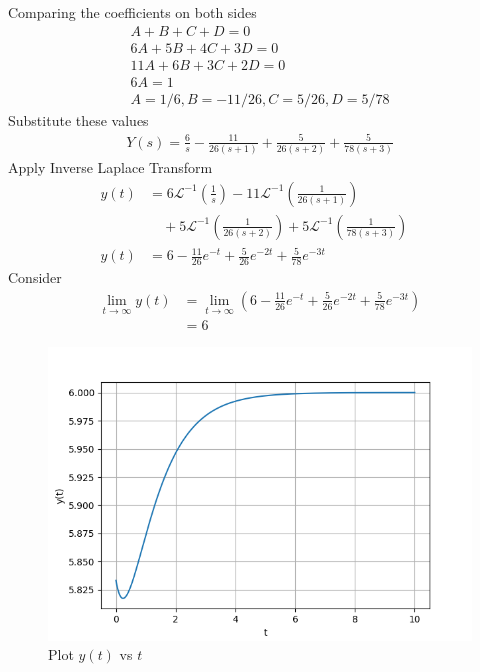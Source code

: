 \documentclass[journal,12pt,twocolumn]{IEEEtran}
\theoremstyle{remark}
\renewcommand{\brak}[1]{\left(#1\right)}
\begin{document}
Comparing the coefficients on both sides \\
\begin{align}
A + B + C + D = 0 \\
6A + 5B + 4C + 3D = 0 \\
11A + 6B + 3C + 2D = 0 \\
6A = 1 \\
A=1/6 ,B = -11/26 , C= 5/26 , D= 5/78 
\end{align}
Substitute these values 
\begin{align}
Y(s) = \frac{6}{s} - \frac{11}{26\brak{s+1}} + \frac{5}{26\brak{s+2}} + \frac{5}{78\brak{s+3}}
\end{align}
Apply Inverse Laplace Transform 
\begin{align}
y(t) &= 6\mathcal{L}^{-1}\brak{\frac{1}{s}} - 11\mathcal{L}^{-1}\brak{\frac{1}{26(s+1)}} & \nonumber \\
&\quad + 5\mathcal{L}^{-1}\brak{\frac{1}{26(s+2)}} + 5\mathcal{L}^{-1}\brak{\frac{1}{78(s+3)}} \\
y(t) &= 6 - \frac{11}{26}e^{-t} + \frac{5}{26}e^{-2t} +\frac{5}{78}e^{-3t}
\end{align}
Consider
\begin{align}
\lim_{t \to \infty} y(t) &= \lim_{t \to \infty} \brak{6 - \frac{11}{26}e^{-t} + \frac{5}{26}e^{-2t} +\frac{5}{78}e^{-3t}} \\
&= 6
\end{align}
\begin{figure}[h!]
\centering
\includegraphics[width=\columnwidth]{figs/plot.png}
\caption{Plot $y(t)$ vs $t$ }
\end{figure}
\end{document}
